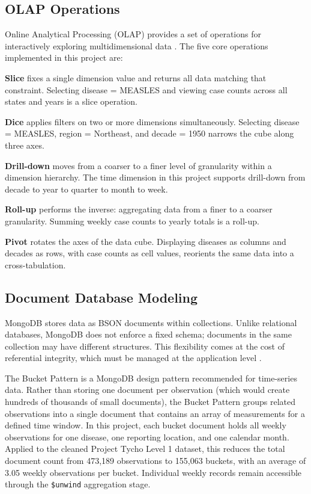 \documentclass[12pt,a4paper]{article}
\begin{document}
\subsection{OLAP Operations}

Online Analytical Processing (OLAP) provides a set of operations for interactively exploring multidimensional data \cite{codd1993, chaudhuri1997}. The five core operations implemented in this project are:

\textbf{Slice} fixes a single dimension value and returns all data matching that constraint. Selecting disease = MEASLES and viewing case counts across all states and years is a slice operation.

\textbf{Dice} applies filters on two or more dimensions simultaneously. Selecting disease = MEASLES, region = Northeast, and decade = 1950 narrows the cube along three axes.

\textbf{Drill-down} moves from a coarser to a finer level of granularity within a dimension hierarchy. The time dimension in this project supports drill-down from decade to year to quarter to month to week.

\textbf{Roll-up} performs the inverse: aggregating data from a finer to a coarser granularity. Summing weekly case counts to yearly totals is a roll-up.

\textbf{Pivot} rotates the axes of the data cube. Displaying diseases as columns and decades as rows, with case counts as cell values, reorients the same data into a cross-tabulation.

\subsection{Document Database Modeling}

MongoDB stores data as BSON documents within collections. Unlike relational databases, MongoDB does not enforce a fixed schema; documents in the same collection may have different structures. This flexibility comes at the cost of referential integrity, which must be managed at the application level \cite{copeland2012}.

The Bucket Pattern is a MongoDB design pattern recommended for time-series data. Rather than storing one document per observation (which would create hundreds of thousands of small documents), the Bucket Pattern groups related observations into a single document that contains an array of measurements for a defined time window. In this project, each bucket document holds all weekly observations for one disease, one reporting location, and one calendar month. Applied to the cleaned Project Tycho Level 1 dataset, this reduces the total document count from 473{,}189 observations to 155{,}063 buckets, with an average of 3.05 weekly observations per bucket. Individual weekly records remain accessible through the \texttt{\$unwind} aggregation stage.
\end{document}
